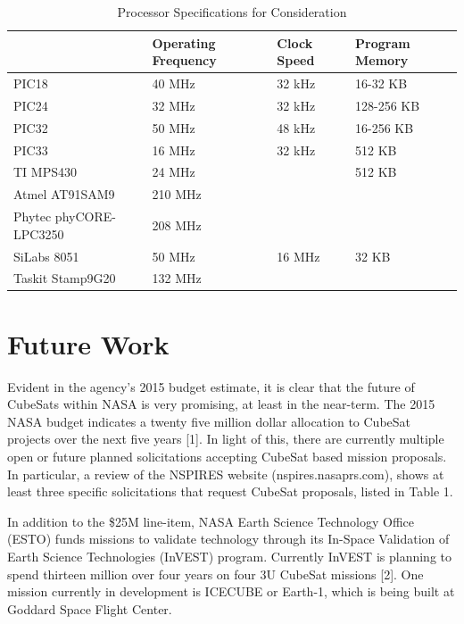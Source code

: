 \documentclass[11pt]{article}
\begin{document}
\begin{table}[h]
\caption{Processor Specifications for Consideration}
\label{processorspecs}
\begin{tabular}{|l|l|l|l|}
\hline
\textbf{} & \textbf{Operating Frequency} & \textbf{Clock Speed} & \textbf{Program Memory} \\ \hline
PIC18 & 40 MHz & 32 kHz & 16-32 KB \\ \hline
PIC24 & 32 MHz & 32 kHz & 128-256 KB \\ \hline
PIC32 & 50 MHz & 48 kHz & 16-256 KB \\ \hline
PIC33 & 16 MHz & 32 kHz & 512 KB \\ \hline
TI MPS430 & 24 MHz &  & 512 KB \\ \hline
Atmel AT91SAM9 & 210 MHz &  &  \\ \hline
Phytec phyCORE-LPC3250 & 208 MHz &  &  \\ \hline
SiLabs 8051 & 50 MHz & 16 MHz & 32 KB \\ \hline
Taskit Stamp9G20 & 132 MHz &  &  \\ \hline
\end{tabular}
\end{table}

\section{Future Work}
Evident in the agency’s 2015 budget estimate, it is clear that the future of CubeSats within NASA is very promising, at least in the near-term. The 2015 NASA budget indicates a twenty five million dollar allocation to CubeSat projects over the next five years [1]. In light of this, there are currently multiple open or future planned solicitations accepting CubeSat based mission proposals. In particular, a review of the NSPIRES website (nspires.nasaprs.com), shows at least three specific solicitations that request CubeSat proposals, listed in Table 1. 

In addition to the \$25M line-item, NASA Earth Science Technology Office (ESTO) funds missions to validate technology through its In-Space Validation of Earth Science Technologies (InVEST) program. Currently InVEST is planning to spend thirteen million over four years on four 3U CubeSat missions [2]. One mission currently in development is ICECUBE or Earth-1, which is being built at Goddard Space Flight Center. 
\end{document}
